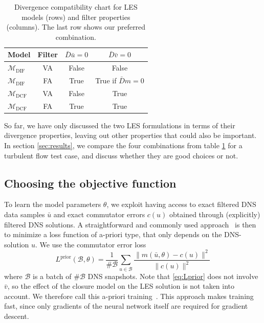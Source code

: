 \documentclass[preprint]{elsarticle}
\begin{document}
\begin{table}[htbp]
    \centering
    \begin{tabular}{l c c c}
    \toprule
    
    Model & Filter & $\bar{D} \bar{u} = 0$ & $\bar{D} \bar{v} = 0$ \\
    
    \midrule
    
    $\mathcal{M}_{\text{DIF}}$ & VA &
    False &
    False \\
    $\mathcal{M}_{\text{DIF}}$ & FA &
    True &
    True if $\bar{D} m = 0$ \\    
    $\mathcal{M}_{\text{DCF}}$ & VA &
    False &
    True \\
    $\mathcal{M}_{\text{DCF}}$ & FA &
    True &
    True \\
    
    \bottomrule
\end{tabular}


    \caption{
        Divergence compatibility chart for LES models (rows)
        and filter properties (columns).
        The last row shows our preferred combination.
    }
    \label{tab:compatibility}
\end{table}

So far, we have only discussed the two LES formulations in terms of their
divergence properties, leaving out other properties that could also be
important. In section \eqref{sec:results}, we compare the four combinations from
table \ref{tab:compatibility} for a turbulent flow test case, and discuss
whether they are good choices or not.

\subsection{Choosing the objective function} \label{sec:model_parameters}

To learn the model parameters $\theta$, we exploit having access to exact
filtered DNS data samples $\bar{u}$ and exact commutator errors $c(u)$
obtained through (explicitly) filtered DNS solutions. A straightforward and
commonly used approach~\cite{King2016,Maulik2017b,Beck2019} is then to minimize
a loss function of a-priori type, that only depends on the DNS-solution $u$.
We use the commutator error loss 
\begin{equation} \label{eq:Lprior}
    L^\text{prior}(\mathcal{B}, \theta) =
    \frac{1}{\# \mathcal{B}}
    \sum_{u \in \mathcal{B}}
    \frac{\| m(\bar{u}, \theta) - c(u) \|^2}{\| c(u) \|^2}
\end{equation}
where $\mathcal{B}$ is a batch of 
$\# \mathcal{B}$ DNS snapshots.
Note that \eqref{eq:Lprior} does not involve $\bar{v}$, so the effect of the
closure model on the LES solution is not taken into account. We therefore call
this a-priori training~\cite{Sanderse2024}. This approach makes training fast,
since only gradients of the neural network itself are required for gradient
descent. 
\end{document}
